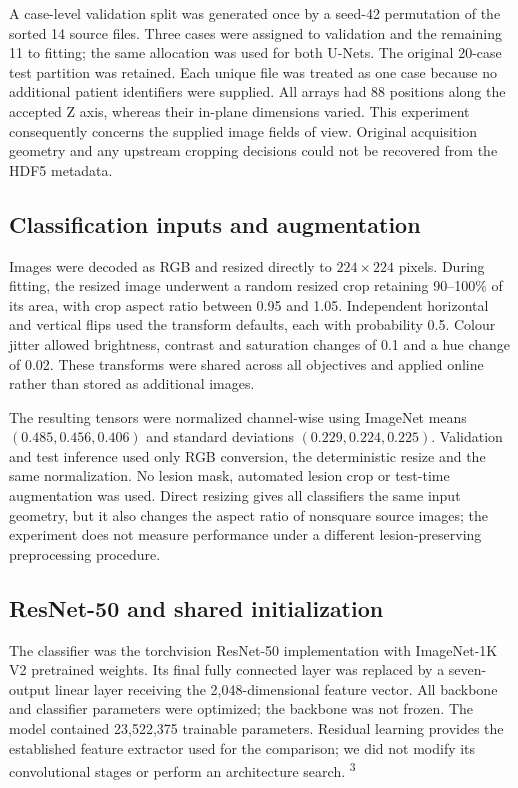 \documentclass[11pt,a4paper]{article}
\begin{document}
A case-level validation split was generated once by a seed-42 permutation of the sorted 14 source files. Three cases were assigned to validation and the remaining 11 to fitting; the same allocation was used for both U-Nets. The original 20-case test partition was retained. Each unique file was treated as one case because no additional patient identifiers were supplied. All arrays had 88 positions along the accepted Z axis, whereas their in-plane dimensions varied. This experiment consequently concerns the supplied image fields of view. Original acquisition geometry and any upstream cropping decisions could not be recovered from the HDF5 metadata.



\subsection*{Classification inputs and augmentation}

Images were decoded as RGB and resized directly to $224\times224$ pixels. During fitting, the resized image underwent a random resized crop retaining 90–100\% of its area, with crop aspect ratio between 0.95 and 1.05. Independent horizontal and vertical flips used the transform defaults, each with probability 0.5. Colour jitter allowed brightness, contrast and saturation changes of 0.1 and a hue change of 0.02. These transforms were shared across all objectives and applied online rather than stored as additional images.



The resulting tensors were normalized channel-wise using ImageNet means $(0.485,0.456,0.406)$ and standard deviations $(0.229,0.224,0.225)$. Validation and test inference used only RGB conversion, the deterministic resize and the same normalization. No lesion mask, automated lesion crop or test-time augmentation was used. Direct resizing gives all classifiers the same input geometry, but it also changes the aspect ratio of nonsquare source images; the experiment does not measure performance under a different lesion-preserving preprocessing procedure.



\subsection*{ResNet-50 and shared initialization}

The classifier was the torchvision ResNet-50 implementation with ImageNet-1K V2 pretrained weights. Its final fully connected layer was replaced by a seven-output linear layer receiving the 2,048-dimensional feature vector. All backbone and classifier parameters were optimized; the backbone was not frozen. The model contained 23,522,375 trainable parameters. Residual learning provides the established feature extractor used for the comparison; we did not modify its convolutional stages or perform an architecture search. \textsuperscript{3}
\end{document}
